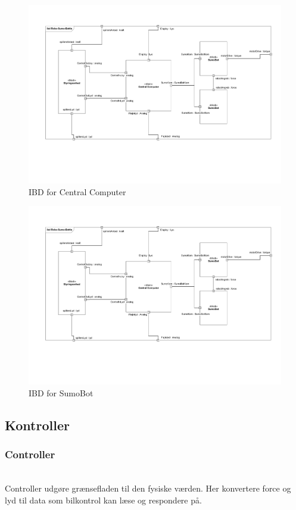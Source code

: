\begin{figure}
	\centering
   	\includegraphics[page=3,width=1\linewidth]{figs/Diagrammer/IBD.pdf}
	\caption{IBD for Central Computer}
	\label{fig:IBD_CentralComputer}
\end{figure}

\begin{figure}
	\centering
   	\includegraphics[page=4,width=1\linewidth]{figs/Diagrammer/IBD.pdf}
	\caption{IBD for SumoBot}
	\label{fig:IBD_SumoBot}
\end{figure}

\subsection{Kontroller}
\subsubsection*{\textbf{Controller}}\hfill\\
Controller udgøre grænsefladen til den fysiske værden. Her konvertere force og lyd til data som bilkontrol kan læse og respondere på.
